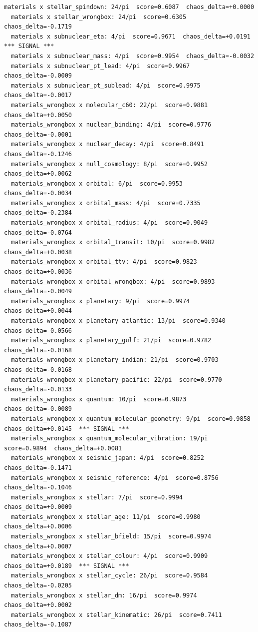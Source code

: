 \documentclass[11pt, letterpaper, openany]{book}
\begin{document}
\begin{empiricalbox}
\begin{lstlisting}[style=terminal]
  materials x stellar_spindown: 24/pi  score=0.6087  chaos_delta=+0.0000
  materials x stellar_wrongbox: 24/pi  score=0.6305  chaos_delta=-0.1719
  materials x subnuclear_eta: 4/pi  score=0.9671  chaos_delta=+0.0191  *** SIGNAL ***
  materials x subnuclear_mass: 4/pi  score=0.9954  chaos_delta=-0.0032
  materials x subnuclear_pt_lead: 4/pi  score=0.9967  chaos_delta=-0.0009
  materials x subnuclear_pt_sublead: 4/pi  score=0.9975  chaos_delta=-0.0017
  materials_wrongbox x molecular_c60: 22/pi  score=0.9881  chaos_delta=+0.0050
  materials_wrongbox x nuclear_binding: 4/pi  score=0.9776  chaos_delta=-0.0001
  materials_wrongbox x nuclear_decay: 4/pi  score=0.8491  chaos_delta=-0.1246
  materials_wrongbox x null_cosmology: 8/pi  score=0.9952  chaos_delta=+0.0062
  materials_wrongbox x orbital: 6/pi  score=0.9953  chaos_delta=-0.0034
  materials_wrongbox x orbital_mass: 4/pi  score=0.7335  chaos_delta=-0.2384
  materials_wrongbox x orbital_radius: 4/pi  score=0.9049  chaos_delta=-0.0764
  materials_wrongbox x orbital_transit: 10/pi  score=0.9982  chaos_delta=+0.0038
  materials_wrongbox x orbital_ttv: 4/pi  score=0.9823  chaos_delta=+0.0036
  materials_wrongbox x orbital_wrongbox: 4/pi  score=0.9893  chaos_delta=-0.0049
  materials_wrongbox x planetary: 9/pi  score=0.9974  chaos_delta=+0.0044
  materials_wrongbox x planetary_atlantic: 13/pi  score=0.9340  chaos_delta=-0.0566
  materials_wrongbox x planetary_gulf: 21/pi  score=0.9782  chaos_delta=-0.0168
  materials_wrongbox x planetary_indian: 21/pi  score=0.9703  chaos_delta=-0.0168
  materials_wrongbox x planetary_pacific: 22/pi  score=0.9770  chaos_delta=-0.0133
  materials_wrongbox x quantum: 10/pi  score=0.9873  chaos_delta=-0.0089
  materials_wrongbox x quantum_molecular_geometry: 9/pi  score=0.9858  chaos_delta=+0.0145  *** SIGNAL ***
  materials_wrongbox x quantum_molecular_vibration: 19/pi  score=0.9894  chaos_delta=+0.0081
  materials_wrongbox x seismic_japan: 4/pi  score=0.8252  chaos_delta=-0.1471
  materials_wrongbox x seismic_reference: 4/pi  score=0.8756  chaos_delta=-0.1046
  materials_wrongbox x stellar: 7/pi  score=0.9994  chaos_delta=+0.0009
  materials_wrongbox x stellar_age: 11/pi  score=0.9980  chaos_delta=+0.0006
  materials_wrongbox x stellar_bfield: 15/pi  score=0.9974  chaos_delta=+0.0007
  materials_wrongbox x stellar_colour: 4/pi  score=0.9909  chaos_delta=+0.0189  *** SIGNAL ***
  materials_wrongbox x stellar_cycle: 26/pi  score=0.9584  chaos_delta=-0.0205
  materials_wrongbox x stellar_dm: 16/pi  score=0.9974  chaos_delta=+0.0002
  materials_wrongbox x stellar_kinematic: 26/pi  score=0.7411  chaos_delta=-0.1087

\end{lstlisting}
\end{empiricalbox}
\end{document}
